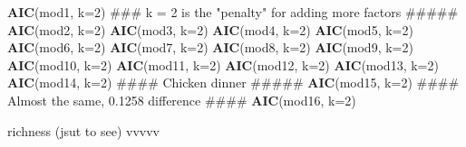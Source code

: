 \documentclass[]{article}
\newenvironment{Shaded}{\begin{snugshade}}{\end{snugshade}}
\newcommand{\KeywordTok}[1]{\textcolor[rgb]{0.13,0.29,0.53}{\textbf{#1}}}
\newcommand{\DataTypeTok}[1]{\textcolor[rgb]{0.13,0.29,0.53}{#1}}
\newcommand{\DecValTok}[1]{\textcolor[rgb]{0.00,0.00,0.81}{#1}}
\newcommand{\NormalTok}[1]{#1}
\begin{document}
\begin{Shaded}
\begin{Highlighting}[]
\KeywordTok{AIC}\NormalTok{(mod1, }\DataTypeTok{k=}\DecValTok{2}\NormalTok{)  ### k = 2 is the "penalty" for adding more factors #####}
\KeywordTok{AIC}\NormalTok{(mod2, }\DataTypeTok{k=}\DecValTok{2}\NormalTok{)}
\KeywordTok{AIC}\NormalTok{(mod3, }\DataTypeTok{k=}\DecValTok{2}\NormalTok{)}
\KeywordTok{AIC}\NormalTok{(mod4, }\DataTypeTok{k=}\DecValTok{2}\NormalTok{) }
\KeywordTok{AIC}\NormalTok{(mod5, }\DataTypeTok{k=}\DecValTok{2}\NormalTok{)}
\KeywordTok{AIC}\NormalTok{(mod6, }\DataTypeTok{k=}\DecValTok{2}\NormalTok{)}
\KeywordTok{AIC}\NormalTok{(mod7, }\DataTypeTok{k=}\DecValTok{2}\NormalTok{)}
\KeywordTok{AIC}\NormalTok{(mod8, }\DataTypeTok{k=}\DecValTok{2}\NormalTok{)}
\KeywordTok{AIC}\NormalTok{(mod9, }\DataTypeTok{k=}\DecValTok{2}\NormalTok{) }
\KeywordTok{AIC}\NormalTok{(mod10, }\DataTypeTok{k=}\DecValTok{2}\NormalTok{)}
\KeywordTok{AIC}\NormalTok{(mod11, }\DataTypeTok{k=}\DecValTok{2}\NormalTok{)}
\KeywordTok{AIC}\NormalTok{(mod12, }\DataTypeTok{k=}\DecValTok{2}\NormalTok{)}
\KeywordTok{AIC}\NormalTok{(mod13, }\DataTypeTok{k=}\DecValTok{2}\NormalTok{)}
\KeywordTok{AIC}\NormalTok{(mod14, }\DataTypeTok{k=}\DecValTok{2}\NormalTok{) #### Chicken dinner  #####}
\KeywordTok{AIC}\NormalTok{(mod15, }\DataTypeTok{k=}\DecValTok{2}\NormalTok{) #### Almost the same, 0.1258 difference ####}
\KeywordTok{AIC}\NormalTok{(mod16, }\DataTypeTok{k=}\DecValTok{2}\NormalTok{)}
\end{Highlighting}
\end{Shaded}

richness (jsut to see) vvvvv
\end{document}
